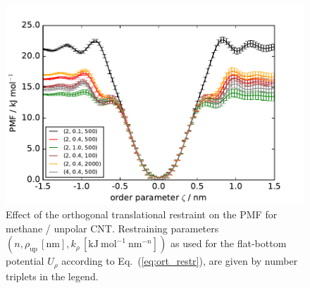 \documentclass[9pt,lessons,pubversion]{livecoms}
\begin{document}
\begin{figure}[htb!]
\includegraphics[width=\linewidth]{figures/pmf_uCNT_uMeth_transres.pdf}
\caption{
Effect of the orthogonal translational restraint on the PMF for methane / unpolar CNT.
Restraining parameters $(n, \rho_\mathrm{up} \, [\mathrm{nm}], k_\rho \, [\mathrm{kJ~mol}^{-1}~\mathrm{nm}^{-n}])$ as used for the flat-bottom potential $U_\rho$  according to Eq.~(\ref{eq:ort_restr}), 
are given by number triplets in the legend.
}
\label{fig:study_restr_lig}
\end{figure}
\end{document}
